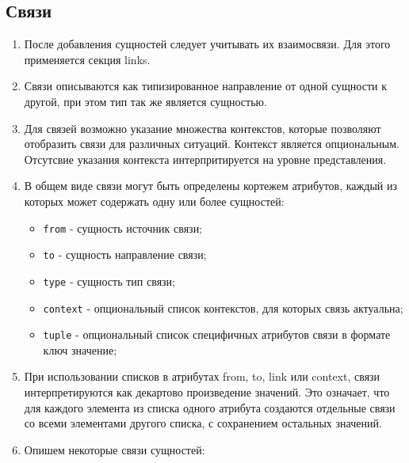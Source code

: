 \documentclass[final]{article}
\begin{document}
    \subsection{Связи}
        \begin{enumerate}

            \item После добавления сущностей следует учитывать их взаимосвязи. 
            Для этого применяется секция links.

            \item Связи описываются как типизированное направление от одной сущности 
            к другой, при этом тип так же является сущностью. 

            \item Для связей возможно указание множества контекстов, которые 
            позволяют отобразить связи для различных ситуаций. Контекст является 
            опциональным. Отсутсвие указания контекста интерпритируется на 
            уровне представления.

            \item В общем виде связи могут быть определены кортежем атрибутов, 
            каждый из которых может содержать одну или более сущностей:

            \begin{itemize}
                \item \texttt{from} - сущность источник связи;
                \item \texttt{to} - сущность направление связи;
                \item \texttt{type} - сущность тип связи;
                \item \texttt{context} - опциональный список контекстов, для 
                которых связь актуальна;
                \item \texttt{tuple} - опциональный список специфичных атрибутов 
                связи в формате ключ значение;
            \end{itemize}

            \item При использовании списков в атрибутах from, to, link или 
            context, связи интерпретируются как декартово произведение значений. 
            Это означает, что для каждого элемента из списка одного атрибута 
            создаются отдельные связи со всеми элементами другого списка, с 
            сохранением остальных значений.

            \item Опишем некоторые связи сущностей:


\end{enumerate}
\end{document}
